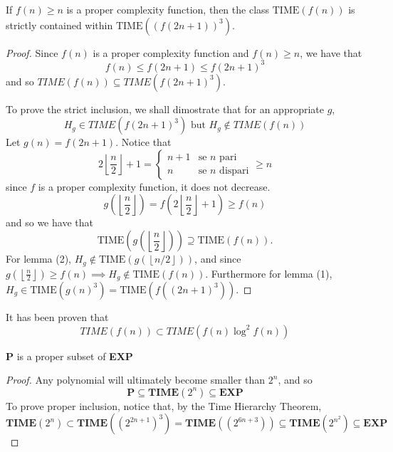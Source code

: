 \documentclass[12pt]{article}
\begin{document}
\begin{defbox}
  
  If $f(n) \geq n$ is a proper complexity function, then the class $\text{TIME}(f(n))$ is strictly contained within $\text{TIME}((f(2n+1))^3)$.
\end{defbox}
\begin{proof}
  Since $f(n)$ is a proper complexity function and $f(n)\ge n$, we have that 
  $$f(n)\le f(2n+1)\le f(2n+1)^3$$
  and so $TIME(f(n))\subseteq TIME(f(2n+1)^3)$. 
  
  To prove the strict inclusion, we shall dimostrate that for an appropriate $g$, 
  $$H_g \in TIME(f(2n+1)^3) \text{ but } H_g \notin TIME(f(n))$$ 
 Let $g(n) = f(2n + 1)$. Notice that
    \[
        2\left\lfloor \frac{n}{2} \right\rfloor + 1 =
        \begin{cases}
            n + 1 & \text{se $n$ pari} \\
            n     & \text{se $n$ dispari}
        \end{cases}
        \geq n
    \]
    since $f$ is a proper complexity function, it does not decrease.
    \[
        g\left(\left\lfloor \frac{n}{2} \right\rfloor\right) = f\left(2\left\lfloor \frac{n}{2} \right\rfloor + 1\right) \geq f(n)
    \]
    and so we have that
    \[
        \text{TIME}\left(g\left(\left\lfloor \frac{n}{2} \right\rfloor\right)\right) \supseteq \text{TIME}(f(n)).
    \]
    For lemma (2), $H_g \notin \text{TIME}(g(\left\lfloor n/2 \right\rfloor))$, and since $g\left(\left\lfloor \frac{n}{2} \right\rfloor\right)\ge f(n) \implies H_g \notin \text{TIME}(f(n))$.
     Furthermore for lemma (1), $H_g \in \text{TIME}(g(n)^3) = \text{TIME}(f((2n+1)^3))$.
\end{proof}
\begin{defbox}
  It has been proven that $$TIME(f(n))\subset TIME(f(n)\log^2f(n))$$
\end{defbox}
\begin{defbox}
  \textbf{P} is a proper subset of \textbf{EXP}
  
\end{defbox}
\begin{proof}
  Any polynomial will ultimately become smaller than $2^n$, and so 
  $$\mathbf{P}\subseteq \textbf{TIME}(2^n)\subseteq \mathbf{EXP}$$
  To prove proper inclusion, notice that, by the Time Hierarchy Theorem, $$\textbf{TIME}(2^n) \subset \textbf{TIME}((2^{2n+1})^3)  = \textbf{TIME}((2^{6n+3}))\subseteq \textbf{TIME}(2^{n^2}) \subseteq \mathbf{EXP}$$
\end{proof}
\end{document}
